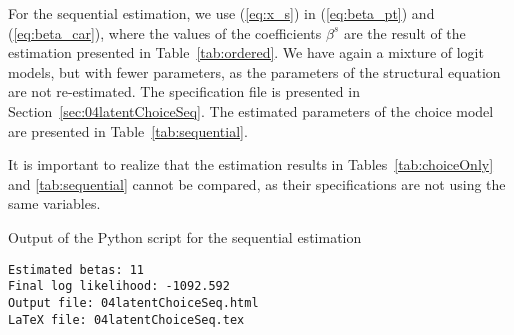 \documentclass[12pt,a4paper]{article}
\newcommand{\req}[1]{(\ref{#1})}
\begin{document}
For the sequential estimation, we use \req{eq:x_s} in \req{eq:beta_pt} and
\req{eq:beta_car}, where the values of the coefficients $\beta^s$ are
the result of the estimation  presented in
Table~\ref{tab:ordered}. We have again a mixture of logit models, but
with fewer parameters, as the parameters of the structural equation
are not re-estimated. The specification file is presented in
Section~\ref{sec:04latentChoiceSeq}. The estimated parameters of the
choice model are presented in Table~\ref{tab:sequential}.

It is important to realize that the estimation results in
Tables~\ref{tab:choiceOnly} and \ref{tab:sequential} cannot be
compared, as their specifications are not using the same variables. 

\begin{table}[htb]
\caption{\label{tab:sequential_output}Output of the Python script for the sequential estimation}
  \begin{lstlisting}
Estimated betas: 11
Final log likelihood: -1092.592
Output file: 04latentChoiceSeq.html
LaTeX file: 04latentChoiceSeq.tex
  \end{lstlisting}
\end{table}
\end{document}
